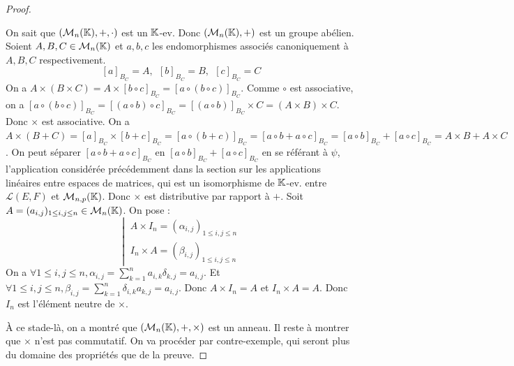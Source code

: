 \documentclass[12pt, a4paper]{report}
\begin{document}
\begin{proof}
    \begin{outline}
        \1 On sait que $(\mathcal M_n(\mathbb{K}),+,\cdot)$ est un $\mathbb{K}$-ev. 
        \1 Donc $(\mathcal M_n(\mathbb{K}),+)$ est un groupe abélien.
        \1 Soient $A,B,C \in \mathcal M_n(\mathbb{K})$ et $a,b,c$ les endomorphismes associés canoniquement à $A,B,C$ respectivement.
        $$[a]_{B_C} = A,~~[b]_{B_C} = B,~~[c]_{B_C} = C$$
        \1 On a $A \times (B \times C) = A \times [b\circ c]_{B_C} = [a \circ (b \circ c)]_{B_C}$.
        \1 Comme $\circ$ est associative, on a $[a \circ (b \circ c)]_{B_C} = [(a \circ b) \circ c]_{B_C} = [(a \circ b)]_{B_C} \times C = (A \times B) \times C$.
        \1 Donc $\times$ est associative.
        \1 On a $A\times(B+C) = [a]_{B_C} \times [b+c]_{B_C} = [a \circ (b+c)]_{B_C} = [a\circ b + a \circ c]_{B_C} = [a\circ b]_{B_C} + [a \circ c]_{B_C} = A\times B + A \times C$.
        \2 On peut séparer $[a \circ b + a \circ c]_{B_C}$ en $[a\circ b]_{B_C} + [a \circ c]_{B_C}$ en se référant à $\psi$, l'application considérée précédemment dans la section sur les applications linéaires entre espaces de matrices, qui est un isomorphisme de $\mathbb{K}$-ev. entre $\mathcal L(E,F)$ et $\mathcal M_{n,p}(\mathbb{K})$.
        \1 Donc $\times$ est distributive par rapport à $+$.
        \1 Soit $A = (a_{i,j})_{1 \le i,j \le n} \in \mathcal M_n(\mathbb{K})$. On pose :
        $$\left|~\begin{matrix}
        A\times I_n = (\alpha_{i,j})_{1 \le i,j \le n} \\
        I_n \times A = (\beta_{i,j})_{1 \le i,j \le n}
        \end{matrix}\right.$$
        \1 On a $\forall 1 \le i,j \le n, \alpha_{i,j} = \sum_{k=1}^n a_{i,k} \delta_{k,j} = a_{i,j}$.
        \1 Et $\forall 1 \le i,j \le n, \beta_{i,j} = \sum_{k=1}^n \delta_{i,k} a_{k,j} = a_{i,j}$.
        \1 Donc $A\times I_n = A$ et $I_n \times A = A$.
        \1 Donc $I_n$ est l'élément neutre de $\times$.
    \end{outline}
    À ce stade-là, on a montré que $(\mathcal M_n(\mathbb{K}),+,\times)$ est un anneau. Il reste à montrer que $\times$ n'est pas commutatif. On va procéder par contre-exemple, qui seront plus du domaine des propriétés que de la preuve.
\end{proof}
\end{document}
